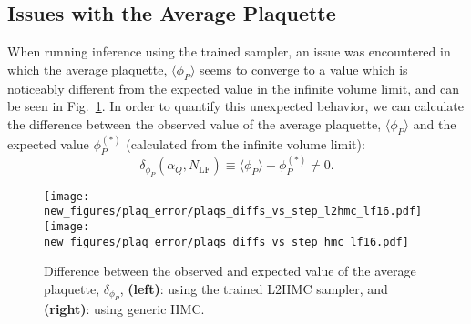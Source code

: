 %
\subsection{Issues with the Average Plaquette}
%
When running inference using the trained sampler, an issue was encountered in
which the average plaquette, $\langle \phi_{P}\rangle$ seems to converge to a
value which is noticeably different from the expected value in the infinite
volume limit, and can be seen in Fig.~\ref{fig:bad_convergence}.
%
In order to quantify this unexpected behavior, we can calculate the difference
between the observed value of the average plaquette, $\langle \phi_{P}\rangle$
and the expected value $\phi_{P}^{(*)}$ (calculated from the infinite volume
limit):
% 
\begin{equation}
  {\delta_{\phi_P}}(\alpha_Q, N_{\mathrm{LF}}) \equiv \langle \phi_P\rangle -
  \phi_{P}^{(*)} \neq 0.
\end{equation}
%


%
%
%
%
\begin{figure}[htpb]%
  \centering
    \texttt{[image: new\_figures/plaq\_error/plaqs\_diffs\_vs\_step\_l2hmc\_lf16.pdf]}
    \texttt{[image: new\_figures/plaq\_error/plaqs\_diffs\_vs\_step\_hmc\_lf16.pdf]}
    \caption{Difference between the observed and expected value of the average
      plaquette, $\delta_{\phi_{P}}$, \textbf{(left)}: using the trained L2HMC
      sampler, and \textbf{(right)}: using generic HMC.}%
\label{fig:bad_convergence}
\end{figure}%
